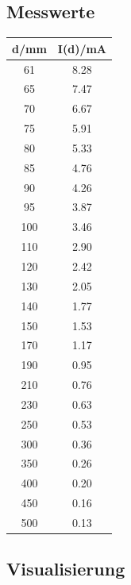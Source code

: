 \documentclass[12pt, a4paper]{article}
\begin{document}
\subsection{Messwerte}
\begin{tabular}{ |c|c| }
    \hline
    d/mm & I(d)/mA \\
    \hline
    \hline
    61 & 8.28 \\
    \hline
    65 & 7.47 \\
    \hline
    70 & 6.67 \\
    \hline
    75 & 5.91 \\
    \hline
    80 & 5.33 \\
    \hline
    85 & 4.76 \\
    \hline
    90 & 4.26 \\
    \hline
    95 & 3.87 \\
    \hline
    100 & 3.46 \\
    \hline
    110 & 2.90 \\
    \hline
    120 & 2.42 \\
    \hline
    130 & 2.05 \\
    \hline
    140 & 1.77 \\
    \hline
    150 & 1.53 \\
    \hline
    170 & 1.17 \\
    \hline
    190 & 0.95 \\
    \hline
    210 & 0.76 \\
    \hline
    230 & 0.63 \\
    \hline
    250 & 0.53 \\
    \hline
    300 & 0.36 \\
    \hline
    350 & 0.26 \\
    \hline
    400 & 0.20 \\
    \hline
    450 & 0.16 \\
    \hline
    500 & 0.13 \\
    \hline
\end{tabular}

\subsection{Visualisierung}
\end{document}

